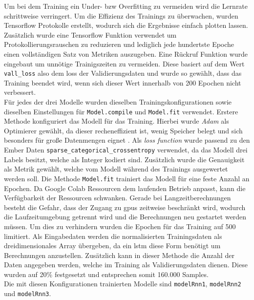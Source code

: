 \documentclass[
    12pt, %
    DIV10,
    ngerman, %
    a4paper, %
    oneside, %
    titlepage, %
    parskip=half, %
    headings=normal, %
    listof=totoc, %
    bibliography=totoc, %
    index=totoc, %
    captions=tableheading, %
    final %
]{scrreprt}
\begin{document}
Um bei dem Training ein Under- bzw Overfitting zu vermeiden wird die Lernrate schrittweise verringert. Um die Effizienz des Trainings zu überwachen, wurden Tensorflow Protokolle erstellt, wodurch sich die Ergebnisse einfach plotten lassen. Zusätzlich wurde eine Tensorflow Funktion verwendet um Protokollierungsrauschen zu reduzieren und lediglich jede hundertste Epoche einen vollständigen Satz von Metriken auszugeben. Eine Rückruf Funktion wurde eingebaut um unnötige Trainigszeiten zu vermeiden. Diese basiert auf dem Wert \texttt{vall\_loss} also dem loss der Validierungsdaten und wurde so gewählt, dass das Training beendet wird, wenn sich dieser Wert innerhalb von 200 Epochen nicht verbessert.\\ Für jedes der drei Modelle wurden dieselben Trainingskonfigurationen sowie dieselben Einstellungen für \texttt{Model.compile} und \texttt{Model.fit} verwendet.
Erstere Methode konfiguriert das Modell für das Training. Hierbei wurde \emph{Adam} als Optimierer gewählt, da dieser recheneffizient ist, wenig Speicher belegt und sich besonders für gro{\ss}e Datenmengen eignet \parencite{Kingma2015}. Als \emph{loss function} wurde passend zu den Ember Daten \texttt{sparse\_categorical\_crossentropy} verwendet, da das Modell drei Labels besitzt, welche als Integer kodiert sind. Zusätzlich wurde die Genauigkeit als Metrik gewählt, welche vom Modell während des Trainings ausgewertet werden soll. Die Methode \texttt{Model.fit} trainiert das Modell für eine feste Anzahl an Epochen. Da Google Colab Ressourcen dem laufenden Betrieb anpasst, kann die Verfügbarkeit der Ressourcen schwanken. Gerade bei Langzeitberechnungen besteht die Gefahr, dass der Zugang zu \acs{gpus} zeitweise beschränkt wird, wodurch die Laufzeitumgebung getrennt wird und die Berechnungen neu gestartet werden müssen. Um dies zu verhindern wurden die Epochen für das Training auf 500 limitiert. Als Eingabedaten werden die normalisierten Trainingsdaten als dreidimensionales Array übergeben, da ein \ac{lstm} diese Form benötigt um Berechnungen anzustellen. Zusätzlich kann in dieser Methode die Anzahl der Daten angegeben werden, welche im Training als Validierungsdaten dienen. Diese wurden auf 20\% festgesetzt und entsprechen somit 160.000 Samples.\\
Die mit diesen Konfigurationen trainierten Modelle sind \texttt{modelRnn1}, \texttt{modelRnn2} und \texttt{modelRnn3}.\\
\end{document}
